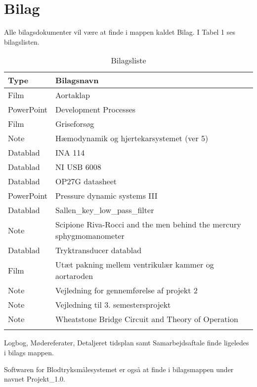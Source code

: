 \chapter{Bilag}
Alle bilagsdokumenter vil være at finde i mappen kaldet Bilag. I Tabel 1  ses bilagslisten. 

 
\begin{longtabu} to 
	\textbf{Type} & \textbf{Bilagsnavn} \\[-1ex]
	\midrule
	 Film 		& Aortaklap \\[-1ex]
	 PowerPoint	&  Development Processes \\[-1ex]
	 Film		&  Griseforsøg \\[-1ex]
	 Note 		&  Hæmodynamik og hjertekarsystemet (ver 5) \\[-1ex]
	 Datablad 	&  INA 114 \\[-1ex]
	 Datablad	&  NI USB 6008 \\[-1ex]
	 Datablad 	&  OP27G datasheet \\[-1ex]
	 PowerPoint &  Pressure dynamic systems III \\[-1ex]
	 Datablad	&  Sallen\_key\_low\_pass\_filter \\[-1ex]
	 Note		&  Scipione Riva-Rocci and the men behind the mercury sphygmomanometer \\[-1ex]
	 Datablad	&  Tryktransducer datablad \\[-1ex]
	 Film 		&  Utæt pakning mellem ventrikulær kammer og aortaroden \\[-1ex]
	 Note		&  Vejledning for gennemførelse af projekt 2 \\[-1ex]
	 Note 		&  Vejledning til 3. semestersprojekt \\[-1ex]
	 Note &  Wheatstone Bridge Circuit and Theory of Operation \\[-1ex]
	 	
	\caption{Bilagsliste}
\end{longtabu}


Logbog, Mødereferater, Detaljeret tidsplan samt Samarbejdsaftale finde ligeledes i bilags mappen. 

Softwaren for Blodtryksmålesystemet er også at finde i bilagsmappen under navnet Projekt\_1.0. 
